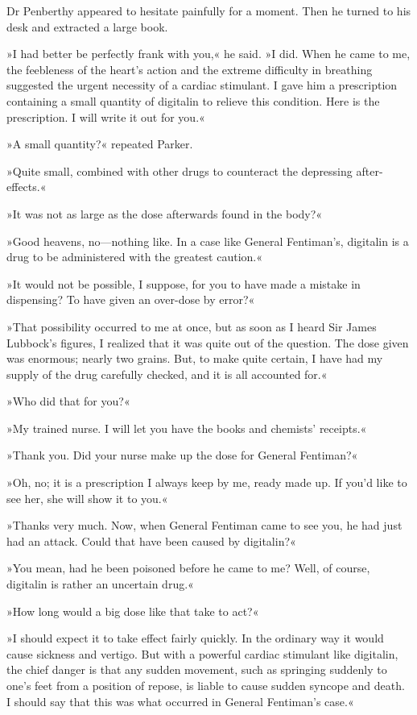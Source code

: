 Dr Penberthy appeared to hesitate painfully for a moment. Then he turned to his desk and extracted a large book.

»I had better be perfectly frank with you,« he said. »I did. When he came to me, the feebleness of the heart's action and the extreme difficulty in breathing suggested the urgent necessity of a cardiac stimulant. I gave him a prescription containing a small quantity of digitalin to relieve this condition. Here is the prescription. I will write it out for you.«

»A small quantity?« repeated Parker.

»Quite small, combined with other drugs to counteract the depressing after-effects.«

»It was not as large as the dose afterwards found in the body?«

»Good heavens, no—nothing like. In a case like General Fentiman's, digitalin is a drug to be administered with the greatest caution.«

»It would not be possible, I suppose, for you to have made a mistake in dispensing? To have given an over-dose by error?«

»That possibility occurred to me at once, but as soon as I heard Sir James Lubbock's figures, I realized that it was quite out of the question. The dose given was enormous; nearly two grains. But, to make quite certain, I have had my supply of the drug carefully checked, and it is all accounted for.«

»Who did that for you?«

»My trained nurse. I will let you have the books and chemists' receipts.«

»Thank you. Did your nurse make up the dose for General Fentiman?«

»Oh, no; it is a prescription I always keep by me, ready made up. If you'd like to see her, she will show it to you.«

»Thanks very much. Now, when General Fentiman came to see you, he had just had an attack. Could that have been caused by digitalin?«

»You mean, had he been poisoned before he came to me? Well, of course, digitalin is rather an uncertain drug.«

»How long would a big dose like that take to act?«

»I should expect it to take effect fairly quickly. In the ordinary way it would cause sickness and vertigo. But with a powerful cardiac stimulant like digitalin, the chief danger is that any sudden movement, such as springing suddenly to one's feet from a position of repose, is liable to cause sudden syncope and death. I should say that this was what occurred in General Fentiman's case.«

